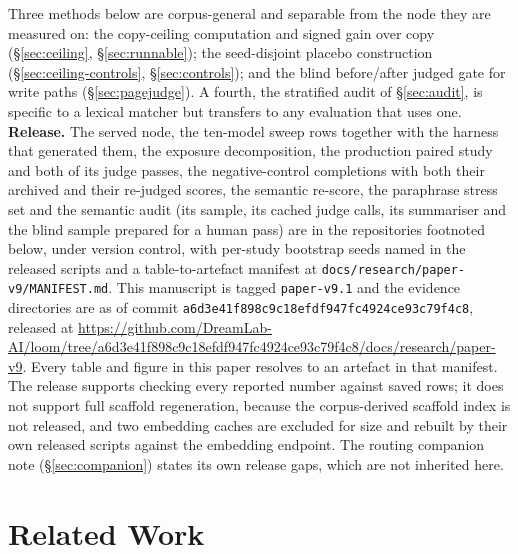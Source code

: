 \documentclass[10pt,twocolumn]{article}
\begin{document}
Three methods below are corpus-general and separable from the node they are measured on: the copy-ceiling computation and signed gain over copy (\S\ref{sec:ceiling}, \S\ref{sec:runnable}); the seed-disjoint placebo construction (\S\ref{sec:ceiling-controls}, \S\ref{sec:controls}); and the blind before/after judged gate for write paths (\S\ref{sec:pagejudge}). A fourth, the stratified audit of \S\ref{sec:audit}, is specific to a lexical matcher but transfers to any evaluation that uses one. \textbf{Release.} The served node, the ten-model sweep rows together with the harness that generated them, the exposure decomposition, the production paired study and both of its judge passes, the negative-control completions with both their archived and their re-judged scores, the semantic re-score, the paraphrase stress set and the semantic audit (its sample, its cached judge calls, its summariser and the blind sample prepared for a human pass) are in the repositories footnoted below, under version control, with per-study bootstrap seeds named in the released scripts and a table-to-artefact manifest at \texttt{docs/research/paper-v9/MANIFEST.md}. This manuscript is tagged \texttt{paper-v9.1} and the evidence directories are as of commit \texttt{a6d3e41f898c9c18efdf947fc4924ce93c79f4c8}, released at \url{https://github.com/DreamLab-AI/loom/tree/a6d3e41f898c9c18efdf947fc4924ce93c79f4c8/docs/research/paper-v9}. Every table and figure in this paper resolves to an artefact in that manifest. The release supports checking every reported number against saved rows; it does not support full scaffold regeneration, because the corpus-derived scaffold index is not released, and two embedding caches are excluded for size and rebuilt by their own released scripts against the embedding endpoint. The routing companion note (\S\ref{sec:companion}) states its own release gaps, which are not inherited here.

\section{Related Work}\label{sec:related}
\end{document}

